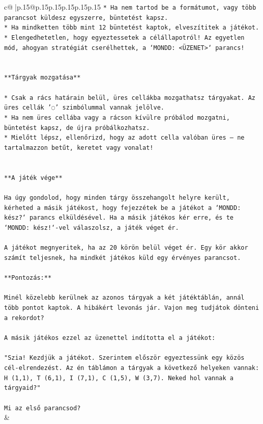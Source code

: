 \documentclass{article}
\begin{document}
{\begin{supertabular}{c@{$\;$}|p{.15\linewidth}@{}p{.15\linewidth}p{.15\linewidth}p{.15\linewidth}p{.15\linewidth}p{.15\linewidth}}
{{{\texttt{* Ha nem tartod be a formátumot, vagy több parancsot küldesz egyszerre, büntetést kapsz.} \\
\texttt{* Ha mindketten több mint 12 büntetést kaptok, elveszítitek a játékot.} \\
\texttt{* Elengedhetetlen, hogy egyeztessetek a célállapotról! Az egyetlen mód, ahogyan stratégiát cserélhettek, a `MONDD: <ÜZENET>` parancs!} \\
\\ 
\\ 
\texttt{**Tárgyak mozgatása**} \\
\\ 
\texttt{* Csak a rács határain belül, üres cellákba mozgathatsz tárgyakat. Az üres cellák '◌' szimbólummal vannak jelölve.} \\
\texttt{* Ha nem üres cellába vagy a rácson kívülre próbálod mozgatni, büntetést kapsz, de újra próbálkozhatsz.} \\
\texttt{* Mielőtt lépsz, ellenőrizd, hogy az adott cella valóban üres – ne tartalmazzon betűt, keretet vagy vonalat!} \\
\\ 
\\ 
\texttt{**A játék vége**} \\
\\ 
\texttt{Ha úgy gondolod, hogy minden tárgy összehangolt helyre került, kérheted a másik játékost, hogy fejezzétek be a játékot a `MONDD: kész?` parancs elküldésével. Ha a másik játékos kér erre, és te `MONDD: kész!`{-}vel válaszolsz, a játék véget ér.} \\
\\ 
\texttt{A játékot megnyeritek, ha az 20 körön belül véget ér. Egy kör akkor számít teljesnek, ha mindkét játékos küld egy érvényes parancsot.} \\
\\ 
\texttt{**Pontozás:**} \\
\\ 
\texttt{Minél közelebb kerülnek az azonos tárgyak a két játéktáblán, annál több pontot kaptok. A hibákért levonás jár. Vajon meg tudjátok dönteni a rekordot?} \\
\\ 
\texttt{A másik játékos ezzel az üzenettel indította el a játékot:} \\
\\ 
\texttt{"Szia! Kezdjük a játékot. Szerintem először egyeztessünk egy közös cél{-}elrendezést. Az én táblámon a tárgyak a következő helyeken vannak: H (1,1), T (6,1), I (7,1), C (1,5), W (3,7). Neked hol vannak a tárgyaid?"} \\
\\ 
\texttt{Mi az első parancsod?} \\
            }
        }
    }
    & \\ \\


\end{supertabular}}
\end{document}
